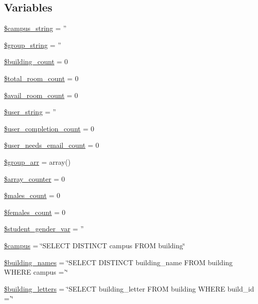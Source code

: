 \subsection*{\-Variables}
\begin{DoxyCompactItemize}
\item 
\hyperlink{index_8php_a9cbaf35082f8edc5439404467c593e5a}{\$campus\-\_\-string} = ''
\item 
\hyperlink{index_8php_a9f3ee723b1a892569e6de7af06e4e7b5}{\$group\-\_\-string} = ''
\item 
\hyperlink{index_8php_abcc551d7bb78645ca485dd1332f3637a}{\$building\-\_\-count} = 0
\item 
\hyperlink{index_8php_afa16349167e96ad1b72ad891ac3d0b07}{\$total\-\_\-room\-\_\-count} = 0
\item 
\hyperlink{index_8php_a02eb1848bf44216bfff32490e891d18a}{\$avail\-\_\-room\-\_\-count} = 0
\item 
\hyperlink{index_8php_af990a6460b9371f7ac0a860c265c47d9}{\$user\-\_\-string} = ''
\item 
\hyperlink{index_8php_a80ebec900a7702cc0c8558ce53366963}{\$user\-\_\-completion\-\_\-count} = 0
\item 
\hyperlink{index_8php_a33eb6cef4540fcb421e0cd11335798a3}{\$user\-\_\-needs\-\_\-email\-\_\-count} = 0
\item 
\hyperlink{index_8php_aacdcd61fee4523e3e12b143603e10590}{\$group\-\_\-arr} = array()
\item 
\hyperlink{index_8php_a23bfd2b4e40b92a4e1df61a3752528d5}{\$array\-\_\-counter} = 0
\item 
\hyperlink{index_8php_a8d7947787809be82314a3f1843adb460}{\$males\-\_\-count} = 0
\item 
\hyperlink{index_8php_a6b8782dbe4c91ae2ca45031af651d818}{\$females\-\_\-count} = 0
\item 
\hyperlink{index_8php_a8c73c9da0db2b0c0fa8d07057849a37e}{\$student\-\_\-gender\-\_\-var} = ''
\item 
\hyperlink{index_8php_a6f0655994f3941d6ab50f681032f899b}{\$campus} = \char`\"{}\-S\-E\-L\-E\-C\-T \-D\-I\-S\-T\-I\-N\-C\-T campus \-F\-R\-O\-M building\char`\"{}
\item 
\hyperlink{index_8php_a8ab55fcf525cc50064165d5b3e77e9a5}{\$building\-\_\-names} = \char`\"{}\-S\-E\-L\-E\-C\-T \-D\-I\-S\-T\-I\-N\-C\-T building\-\_\-name \-F\-R\-O\-M building \-W\-H\-E\-R\-E campus ='\char`\"{}
\item 
\hyperlink{index_8php_ab7c3ef21f41bcddbed5d1f3b591342da}{\$building\-\_\-letters} = \char`\"{}\-S\-E\-L\-E\-C\-T building\-\_\-letter \-F\-R\-O\-M building \-W\-H\-E\-R\-E build\-\_\-id ='\char`\"{}

\end{DoxyCompactItemize}
